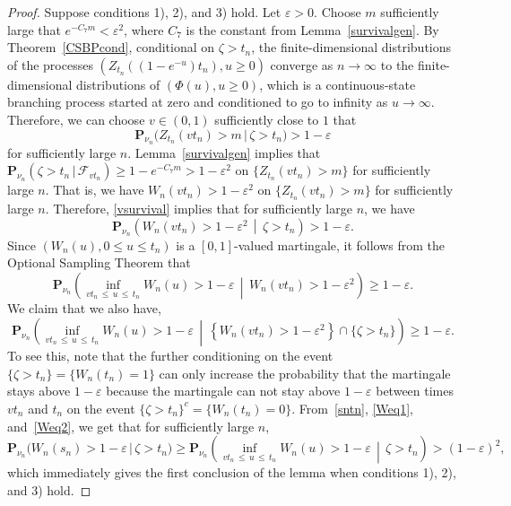 \documentclass[10pt]{amsart}
\theoremstyle{definition}\newtheorem{defi}[theo]{Definition}\newtheorem{rema}[theo]{Remark}\newtheorem{exam}[theo]{Example}\newtheorem{exem}[theo]{Example}\newtheorem{nota}[theo]{Notation}
\newcommand*\eps{\varepsilon}
\renewcommand*\P{\mathbf{P}}
\newcommand\F{\mathcal{F}}
\newcommand{\1} {\mathds{1}}
\begin{document}
\begin{proof}
Suppose conditions 1), 2), and 3) hold. Let $\eps > 0$. Choose $m$ sufficiently large that $e^{-C_7 m} < \eps^2$, where $C_7$ is the constant from Lemma~\ref{survivalgen}. By Theorem~\ref{CSBPcond}, conditional on $\zeta > t_n$, the finite-dimensional distributions of the processes $(Z_{t_n}((1 - e^{-u}) t_n), u \geq 0)$ converge as $n \rightarrow \infty$ to the finite-dimensional distributions of $(\Phi(u), u \geq 0)$, which is a continuous-state branching process started at zero and conditioned to go to infinity as $u \rightarrow \infty$. Therefore, we can choose $v \in (0, 1)$ sufficiently close to $1$ that
\begin{equation}\label{vsurvival}
\P_{\nu_n}\big(Z_{t_n}(vt_n) > m \,\big|\, \zeta > t_n\big) > 1 - \eps
\end{equation}
for sufficiently large $n$. Lemma~\ref{survivalgen} implies that $\P_{\nu_n}(\zeta > t_n\,|\,\F_{vt_n}) \geq 1 - e^{-C_7 m} > 1 - \eps^2$ on $\{Z_{t_n}(vt_n) > m\}$ for sufficiently large $n$. That is, we have $W_n(vt_n) > 1 - \eps^2$ on $\{Z_{t_n}(vt_n) > m\}$ for sufficiently large $n$. Therefore, \eqref{vsurvival} implies that for sufficiently large $n$, we have
\begin{equation}\label{Weq1}
\P_{\nu_n}\left(W_n(vt_n) > 1 - \eps^2 \,\middle|\, \zeta > t_n\right) > 1 - \eps.
\end{equation}
Since $(W_n(u), 0 \leq u \leq t_n)$ is a $[0,1]$-valued martingale, it follows from the Optional Sampling Theorem that
\[
\P_{\nu_n}\left(\inf_{vt_n\,\leq\,u\,\leq\,t_n} W_n(u) > 1 - \eps \,\middle| \, W_n(vt_n) > 1 - \eps^2\right) \geq 1 - \eps.
\]
We claim that we also have,
\begin{equation}\label{Weq2}
\P_{\nu_n}\left(\inf_{vt_n\,\leq\,u\,\leq\,t_n} W_n(u) > 1 - \eps \,\middle| \, \left\{W_n(vt_n) > 1 - \eps^2\right\} \cap \{\zeta > t_n\}\right) \geq 1 - \eps.
\end{equation}
To see this, note that the further conditioning on the event $\{\zeta > t_n\} = \{W_n(t_n) = 1\}$ can only increase the probability that the martingale stays above $1 - \eps$ because the martingale can not stay above $1 - \eps$ between times $vt_n$ and $t_n$ on the event $\{\zeta > t_n\}^c = \{W_n(t_n) = 0\}$. From~\eqref{sntn}, \eqref{Weq1}, and~\eqref{Weq2}, we get that for sufficiently large $n$,
\[
\P_{\nu_n}\big(W_n(s_n) > 1 - \eps \,\big|\, \zeta > t_n\big) \geq \P_{\nu_n}\left(\inf_{vt_n\,\leq\,u\,\leq\,t_n} W_n(u) > 1 - \eps \,\middle|\, \zeta > t_n \right) > (1 - \eps)^2,
\]
which immediately gives the first conclusion of the lemma when conditions 1), 2), and 3) hold.


\end{proof}
\end{document}
